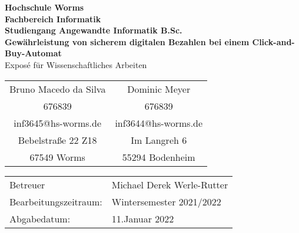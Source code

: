 \begin{titlepage}
    \vspace*{2mm}
    \begin{center}
        \Large
        \textbf{Hochschule Worms}\\
        \textbf{Fachbereich Informatik}\\
        \textbf{Studiengang Angewandte Informatik B.Sc.}\\
        \vspace{1cm}
        \textbf{Gewährleistung von sicherem digitalen Bezahlen bei einem Click-and-Buy-Automat}\\
        \vspace{1cm}
        \large
        Exposé für Wissenschaftliches Arbeiten\\
        \vspace{4cm}
        \begin {table}[ht]
            \centering
            \begin{tabular}{c c}
                Bruno Macedo da Silva    & Dominic Meyer \\ 
                676839                   & 676839         \\
                inf3645@hs-worms.de      & inf3644@hs-worms.de \\
                Bebelstraße 22 Z18       & Im Langreh 6 \\
                67549 Worms              & 55294 Bodenheim \\
            \end{tabular}
        \end {table}
        \vspace{2cm}
        \large
        \vspace{1cm}
         \begin {table}[ht]
             \centering
             \begin{tabular}{l l}
                Betreuer                & Michael Derek Werle-Rutter \\
                Bearbeitungszeitraum:   & Wintersemester 2021/2022 \\
                Abgabedatum:            & 11.Januar 2022 \\
             \end{tabular}
         \end {table}
    \end{center}
    \normalsize
    \vfill
 


\end{titlepage}